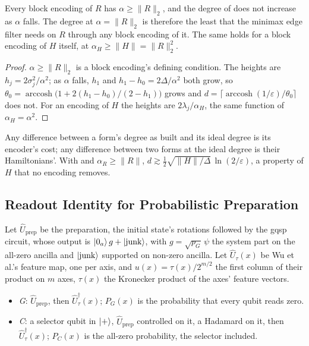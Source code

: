 \begin{proposition}
\label{prop:ideal-degree}
Every block encoding of $R$ has $\alpha\ge\|R\|_2$, and the degree of  does not increase as $\alpha$ falls. The degree at $\alpha=\|R\|_2$ is therefore the least that the minimax edge filter needs on $R$ through any block encoding of it. The same holds for a block encoding of $H$ itself, at $\alpha_H\ge\|H\|=\|R\|_2^2$.
\end{proposition}
\begin{proof}
$\alpha\ge\|R\|_2$ is a block encoding's defining condition. The heights are $h_j=2\sigma_j^2/\alpha^2$; as $\alpha$ falls, $h_1$ and $h_1-h_0=2\Delta/\alpha^2$ both grow, so $\theta_0=\operatorname{arccosh}\bigl(1+2(h_1-h_0)/(2-h_1)\bigr)$ grows and $d=\lceil\operatorname{arccosh}(1/\varepsilon)/\theta_0\rceil$ does not. For an encoding of $H$ the heights are $2\lambda_j/\alpha_H$, the same function of $\alpha_H=\alpha^2$.
\end{proof}

Any difference between a form's degree as built and its ideal degree is its encoder's cost; any difference between two forms at the ideal degree is their Hamiltonians'. With  and $\alpha_R\ge\|R\|$, $d\gtrsim\tfrac12\sqrt{\|H\|/\Delta}\,\ln(2/\varepsilon)$, a property of $H$ that no encoding removes.

\subsection{Readout Identity for Probabilistic Preparation}
\label{app:readout-identity}

Let $\hat U_{\mathrm{prep}}$ be the preparation, the initial state's rotations followed by the \gls{gqsp} circuit, whose output is $\ket{0_a}g+\ket{\mathrm{junk}}$, with $g=\sqrt{p_G}\,\psi$ the system part on the all-zero ancilla and $\ket{\mathrm{junk}}$ supported on non-zero ancilla. Let $\hat U_\tau(x)$ be Wu et al.'s feature map, one per axis, and $u(x)=\tau(x)/2^{m/2}$ the first column of their product on $m$ axes, $\tau(x)$ the Kronecker product of the axes' feature vectors.
\begin{itemize}
    \item \emph{G}: $\hat U_{\mathrm{prep}}$, then $\hat U_\tau^\dagger(x)$; $P_G(x)$ is the probability that every qubit reads zero.
    \item \emph{C}: a selector qubit in $\ket+$, $\hat U_{\mathrm{prep}}$ controlled on it, a Hadamard on it, then $\hat U_\tau^\dagger(x)$; $P_C(x)$ is the all-zero probability, the selector included.
\end{itemize}

